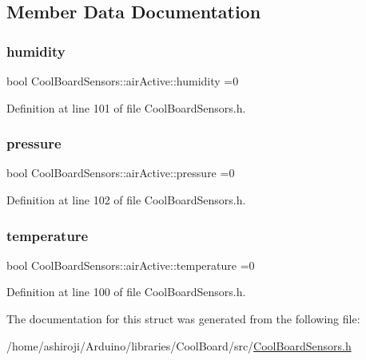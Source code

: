 \subsection{Member Data Documentation}
\mbox{\label{struct_cool_board_sensors_1_1air_active_ab69738e9fd1c2ba80dc666bcd1e116f7}} 
\subsubsection{\texorpdfstring{humidity}{humidity}}
{\footnotesize\ttfamily bool Cool\+Board\+Sensors\+::air\+Active\+::humidity =0}



Definition at line 101 of file Cool\+Board\+Sensors.\+h.

\mbox{\label{struct_cool_board_sensors_1_1air_active_a15932ccfb6ee6603713d937ec9b76b72}} 
\subsubsection{\texorpdfstring{pressure}{pressure}}
{\footnotesize\ttfamily bool Cool\+Board\+Sensors\+::air\+Active\+::pressure =0}



Definition at line 102 of file Cool\+Board\+Sensors.\+h.

\mbox{\label{struct_cool_board_sensors_1_1air_active_ac08576736c7ac3bfbfec32e5ee17c686}} 
\subsubsection{\texorpdfstring{temperature}{temperature}}
{\footnotesize\ttfamily bool Cool\+Board\+Sensors\+::air\+Active\+::temperature =0}



Definition at line 100 of file Cool\+Board\+Sensors.\+h.



The documentation for this struct was generated from the following file\+:\begin{DoxyCompactItemize}
\item 
/home/ashiroji/\+Arduino/libraries/\+Cool\+Board/src/\hyperlink{_cool_board_sensors_8h}{Cool\+Board\+Sensors.\+h}\end{DoxyCompactItemize}
